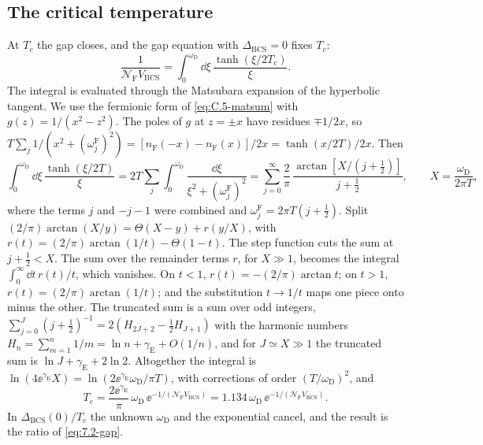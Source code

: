\subsection*{The critical temperature}

At $T_c$ the gap closes, and the gap equation with $\Delta_{\mathrm{BCS}} = 0$ fixes $T_c$:
\begin{equation*}
  \frac{1}{\mathcal{N}_{\mathrm{F}}V_{\mathrm{BCS}}} = \int_0^{\omega_{\mathrm{D}}}\dd\xi\,\frac{\tanh(\xi/2T_c)}{\xi} .
\end{equation*}
The integral is evaluated through the Matsubara expansion of the hyperbolic tangent. We use the fermionic form of \cref{eq:C.5-matsum} with $g(z) = 1/(x^2 - z^2)$. The poles of $g$ at $z = \pm x$ have residues $\mp1/2x$, so $T\sum_j1/(x^2 + (\omega^{\mathrm{F}}_j)^2) = [n_{\mathrm{F}}(-x) - n_{\mathrm{F}}(x)]/2x = \tanh(x/2T)/2x$. Then
\begin{equation*}
  \int_0^{\omega_{\mathrm{D}}}\dd\xi\,\frac{\tanh(\xi/2T)}{\xi} = 2T\sum_j\int_0^{\omega_{\mathrm{D}}}\frac{\dd\xi}{\xi^2 + (\omega^{\mathrm{F}}_j)^2}
  = \sum_{j=0}^\infty\frac{2}{\pi}\,\frac{\arctan[X/(j + \frac12)]}{j + \frac12}, \qquad X = \frac{\omega_{\mathrm{D}}}{2\pi T} ,
\end{equation*}
where the terms $j$ and $-j - 1$ were combined and $\omega^{\mathrm{F}}_j = 2\pi T(j + \frac12)$. Split $(2/\pi)\arctan(X/y) = \Theta(X - y) + r(y/X)$, with $r(t) = (2/\pi)\arctan(1/t) - \Theta(1 - t)$. The step function cuts the sum at $j + \frac12 < X$. The sum over the remainder terms $r$, for $X \gg 1$, becomes the integral $\int_0^\infty\dd t\,r(t)/t$, which vanishes. On $t < 1$, $r(t) = -(2/\pi)\arctan t$; on $t > 1$, $r(t) = (2/\pi)\arctan(1/t)$; and the substitution $t \to 1/t$ maps one piece onto minus the other. The truncated sum is a sum over odd integers, $\sum_{j=0}^{J}(j + \frac12)^{-1} = 2(H_{2J+2} - \frac12H_{J+1})$ with the harmonic numbers $H_n = \sum_{m=1}^n1/m = \ln n + \gamma_{\mathrm{E}} + O(1/n)$, and for $J \simeq X \gg 1$ the truncated sum is $\ln J + \gamma_{\mathrm{E}} + 2\ln2$. Altogether the integral is $\ln(4\ee^{\gamma_{\mathrm{E}}}X) = \ln(2\ee^{\gamma_{\mathrm{E}}}\omega_{\mathrm{D}}/\pi T)$, with corrections of order $(T/\omega_{\mathrm{D}})^2$, and
\begin{equation*}
  T_c = \frac{2\ee^{\gamma_{\mathrm{E}}}}{\pi}\,\omega_{\mathrm{D}}\,\ee^{-1/(\mathcal{N}_{\mathrm{F}}V_{\mathrm{BCS}})} = 1.134\,\omega_{\mathrm{D}}\,\ee^{-1/(\mathcal{N}_{\mathrm{F}}V_{\mathrm{BCS}})} .
\end{equation*}
In $\Delta_{\mathrm{BCS}}(0)/T_c$ the unknown $\omega_{\mathrm{D}}$ and the exponential cancel, and the result is the ratio of \cref{eq:7.2-gap}.

